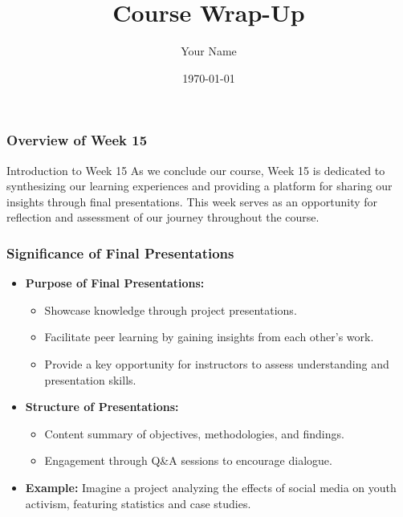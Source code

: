 \documentclass[aspectratio=169]{beamer}
\begin{document}
\frame{\titlepage}

\begin{frame}[fragile]
    \title{Course Wrap-Up}
    \author{Your Name}
    \date{\today}
    \maketitle
\end{frame}

\begin{frame}[fragile]
    \frametitle{Overview of Week 15}
    
    \begin{block}{Introduction to Week 15}
        As we conclude our course, Week 15 is dedicated to synthesizing our learning experiences and providing a platform for sharing our insights through final presentations. This week serves as an opportunity for reflection and assessment of our journey throughout the course.
    \end{block}
\end{frame}

\begin{frame}[fragile]
    \frametitle{Significance of Final Presentations}
    
    \begin{itemize}
        \item \textbf{Purpose of Final Presentations:}
        \begin{itemize}
            \item Showcase knowledge through project presentations.
            \item Facilitate peer learning by gaining insights from each other’s work.
            \item Provide a key opportunity for instructors to assess understanding and presentation skills.
        \end{itemize}
        
        \item \textbf{Structure of Presentations:}
        \begin{itemize}
            \item Content summary of objectives, methodologies, and findings.
            \item Engagement through Q\&A sessions to encourage dialogue.
        \end{itemize}
        
        \item \textbf{Example:}
        Imagine a project analyzing the effects of social media on youth activism, featuring statistics and case studies.
    \end{itemize}
\end{frame}
\end{document}
